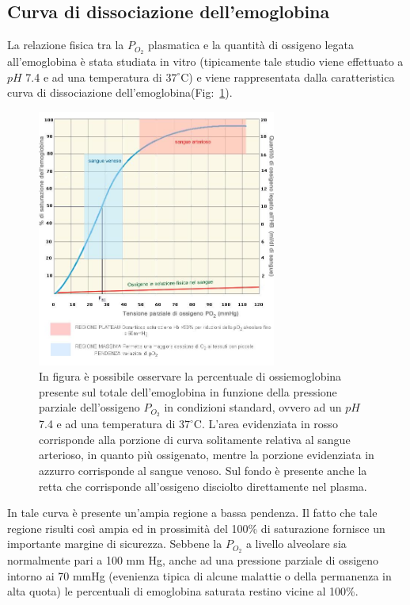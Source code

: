 \documentclass[a4paper, 12pt]{book}
\begin{document}
\subsection{Curva di dissociazione dell'emoglobina}

La relazione fisica tra la $P_{O_2}$ plasmatica e la quantità di ossigeno legata all'emoglobina è stata studiata in vitro (tipicamente tale studio viene effettuato a $pH$ 7.4 e ad una temperatura di $37^\circ$C) e viene rappresentata dalla caratteristica curva di dissociazione dell'emoglobina(Fig:~\ref{fig:Dissociation Curve}).
\begin{figure}[h!]
    \centering
    \includegraphics[width=0.7\textwidth]{emoglobina2.jpeg}
    \caption{In figura è possibile osservare la percentuale di ossiemoglobina presente 					 sul totale dell'emoglobina in funzione della pressione parziale 							 dell'ossigeno $P_{O_2}$ in condizioni standard, ovvero ad un $pH$ 7.4 e ad 			 una temperatura di $37^\circ$C.
			 L'area evidenziata in rosso corrisponde alla porzione di curva solitamente 			 relativa al sangue arterioso, in quanto più ossigenato, mentre la porzione 			 evidenziata in azzurro corrisponde al sangue venoso.
			 Sul fondo è presente anche la retta che corrisponde all'ossigeno disciolto 			 direttamente nel plasma.}
    \label{fig:Dissociation Curve}
\end{figure}
In tale curva è presente un'ampia regione a bassa pendenza.
Il fatto che tale regione risulti così ampia ed in prossimità del 100\% di saturazione fornisce un importante margine di sicurezza.
Sebbene la $P_{O_2}$ a livello alveolare sia normalmente pari a 100 mm Hg, anche ad una pressione parziale di ossigeno intorno ai 70 mmHg (evenienza tipica di alcune malattie o della permanenza in alta quota) le percentuali di emoglobina saturata restino vicine al 100\%.
\end{document}
